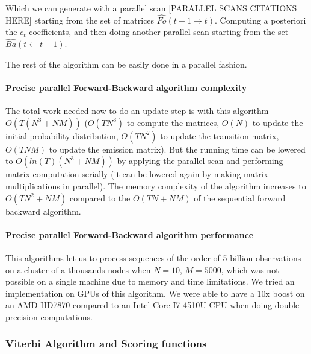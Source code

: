 Which we can generate with a parallel scan [PARALLEL SCANS CITATIONS HERE] starting from the set of matrices $\hat{Fo}( t - 1 \rightarrow t)$. Computing a posteriori the $c_t$ coefficients, and then doing another parallel scan starting from the set $\hat{Ba}(t \leftarrow t+1)$.

The rest of the algorithm can be easily done in a parallel fashion.

\paragraph{Precise parallel Forward-Backward algorithm complexity}
The total work needed now to do an update step is with this algorithm $O(T(N^3 + NM))$ ($O(TN^3)$ to compute the matrices, $O(N)$ to update the initial probability distribution, $O(TN^2)$ to update the transition matrix, $O(TNM)$ to update the emission matrix). But the running time can be lowered to $O(ln(T)(N^3 + NM))$ by applying the parallel scan and performing matrix computation serially (it can be lowered again by making matrix multiplications in parallel).
The memory complexity of the algorithm increases to $O(TN^2 + NM)$ compared to the $O(TN + NM)$ of the sequential forward backward algorithm.
\paragraph{Precise parallel Forward-Backward algorithm performance}
This algorithms let us to process sequences of the order of 5 billion observations on a cluster of a thousands nodes when $N=10$, $M=5000$, which was not possible on a single machine due to memory and time limitations.
We tried an implementation on GPUs of this algorithm. We were able to have a 10x boost on an AMD HD7870 compared to an Intel Core I7 4510U CPU when doing double precision computations.
\subsubsection{Viterbi Algorithm and Scoring functions}


